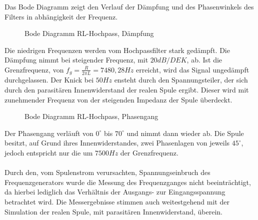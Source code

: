 Das Bode Diagramm zeigt den Verlauf der Dämpfung und des Phasenwinkels des Filters in abhängigkeit der Frequenz.\\
\begin{figure}[H]
  \centering
  \caption{Bode Diagramm RL-Hochpass, Dämpfung}
\end{figure}
\noindent
Die niedrigen Frequenzen werden vom Hochpassfilter stark gedämpft. Die Dämpfung nimmt bei steigender Frequenz, mit $20dB/DEK$, ab. Ist die Grenzfrequenz, von 
$f_g = \frac{R}{2\pi L} = 7480,28Hz$ erreicht, wird das Signal ungedämpft durchgelassen. Der Knick bei $50Hz$ ensteht durch den Spannungsteiler, der sich durch den
parasitären Innenwiderstand der realen Spule ergibt. Dieser wird mit zunehmender Frequenz von der steigenden Impedanz der Spule überdeckt.\\

\begin{figure}[H]
  \centering
  \caption{Bode Diagramm RL-Hochpass, Phasengang}
\end{figure}
\noindent
Der Phasengang verläuft von $0^\circ$ bis $70^\circ$ und nimmt dann wieder ab. Die Spule besitzt, auf Grund ihres Innenwiderstandes, zwei Phasenlagen von jeweils $45^\circ$, 
jedoch entspricht nur die um $7500Hz$ der Grenzfrequenz.\\
\\
Durch den, vom Spulenstrom verursachten, Spannungseinbruch des Frequenzgenerators wurde die Messung des Frequenzganges nicht beeinträchtigt, da hierbei lediglich
das Verhältnis der Ausgangs- zur Eingangsspannung betrachtet wird. Die Messergebnisse stimmen auch weitestgehend mit der Simulation der realen Spule, mit parasitären 
Innenwiderstand, überein. \\